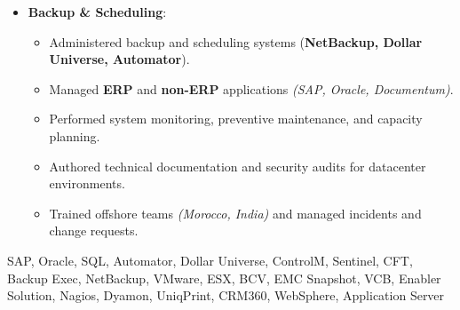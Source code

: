 \begin{experiences}
{\begin{itemize}[left=0pt,label={},itemsep=0.5em]
          \item \textbf{Backup \& Scheduling}:
            \begin{itemize}[itemsep=0.2em,topsep=0.2em,parsep=0pt]
              \small
              \item Administered backup and scheduling systems (\textbf{NetBackup, Dollar Universe, Automator}).
              \item Managed \textbf{ERP} and \textbf{non-ERP} applications \emph{(SAP, Oracle, Documentum)}.
              \item Performed system monitoring, preventive maintenance, and capacity planning.
              \item Authored technical documentation and security audits for datacenter environments.
              \item Trained offshore teams \emph{(Morocco, India)} and managed incidents and change requests.
            \end{itemize}

        \end{itemize}
    }
    {SAP, Oracle, SQL, Automator, Dollar Universe, ControlM, Sentinel, CFT, Backup Exec, NetBackup, VMware, ESX, BCV, EMC Snapshot, VCB, Enabler Solution, Nagios, Dyamon, UniqPrint, CRM360, WebSphere, Application Server}

\emptySeparator
\end{experiences}
